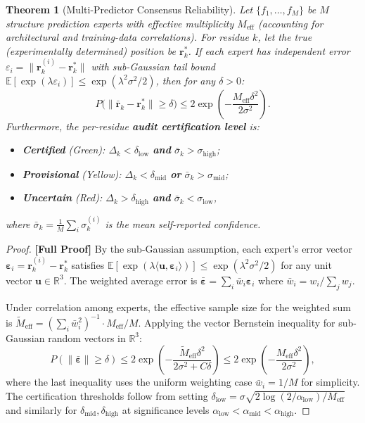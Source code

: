 \documentclass[12pt,a4paper]{article}
\newtheorem{theorem}{Theorem}[section]
\theoremstyle{remark}
\newcommand{\R}{\mathbb{R}}
\newcommand{\E}{\mathbb{E}}
\newcommand{\rigorFull}{\textbf{[Full Proof]}}
\begin{document}
\begin{theorem}[Multi-Predictor Consensus Reliability]
\label{thm:multi-consensus}
Let $\{f_1, \dots, f_M\}$ be $M$ structure prediction experts with effective multiplicity $M_{\text{eff}}$ (accounting for architectural and training-data correlations).
For residue $k$, let the true (experimentally determined) position be $\mathbf{r}_k^*$.
If each expert has independent error $\varepsilon_i = \|\mathbf{r}_k^{(i)} - \mathbf{r}_k^*\|$ with sub-Gaussian tail bound $\E[\exp(\lambda \varepsilon_i)] \leq \exp(\lambda^2 \sigma^2 / 2)$, then for any $\delta > 0$:
\begin{equation}
    P\big(\|\bar{\mathbf{r}}_k - \mathbf{r}_k^*\| \geq \delta\big) \leq 2 \exp\!\left(-\frac{M_{\text{eff}} \delta^2}{2\sigma^2}\right).
\end{equation}
Furthermore, the per-residue \textbf{audit certification level} is:
\begin{itemize}[leftmargin=*]
    \item \textbf{Certified} (Green): $\Delta_k < \delta_{\text{low}}$ \textbf{and} $\bar{\sigma}_k > \sigma_{\text{high}}$;
    \item \textbf{Provisional} (Yellow): $\Delta_k < \delta_{\text{mid}}$ \textbf{or} $\bar{\sigma}_k > \sigma_{\text{mid}}$;
    \item \textbf{Uncertain} (Red): $\Delta_k > \delta_{\text{high}}$ \textbf{and} $\bar{\sigma}_k < \sigma_{\text{low}}$,
\end{itemize}
where $\bar{\sigma}_k = \frac{1}{M}\sum_i \sigma_k^{(i)}$ is the mean self-reported confidence.
\end{theorem}

\begin{proof}
\rigorFull
By the sub-Gaussian assumption, each expert's error vector $\bm{\varepsilon}_i = \mathbf{r}_k^{(i)} - \mathbf{r}_k^*$ satisfies $\E[\exp(\lambda \langle \mathbf{u}, \bm{\varepsilon}_i \rangle)] \leq \exp(\lambda^2 \sigma^2 / 2)$ for any unit vector $\mathbf{u} \in \R^3$.
The weighted average error is $\bar{\bm{\varepsilon}} = \sum_i \bar{w}_i \bm{\varepsilon}_i$ where $\bar{w}_i = w_i / \sum_j w_j$.

Under correlation among experts, the effective sample size for the weighted sum is $\tilde{M}_{\text{eff}} = (\sum_i \bar{w}_i^2)^{-1} \cdot M_{\text{eff}} / M$.
Applying the vector Bernstein inequality for sub-Gaussian random vectors in $\R^3$:
\begin{equation}
    P(\|\bar{\bm{\varepsilon}}\| \geq \delta) \leq 2 \exp\!\left(-\frac{\tilde{M}_{\text{eff}} \delta^2}{2\sigma^2 + C\delta}\right)
    \leq 2 \exp\!\left(-\frac{M_{\text{eff}} \delta^2}{2\sigma^2}\right),
\end{equation}
where the last inequality uses the uniform weighting case $\bar{w}_i = 1/M$ for simplicity.
The certification thresholds follow from setting $\delta_{\text{low}} = \sigma \sqrt{2\log(2/\alpha_{\text{low}}) / M_{\text{eff}}}$ and similarly for $\delta_{\text{mid}}, \delta_{\text{high}}$ at significance levels $\alpha_{\text{low}} < \alpha_{\text{mid}} < \alpha_{\text{high}}$.
\end{proof}
\end{document}
